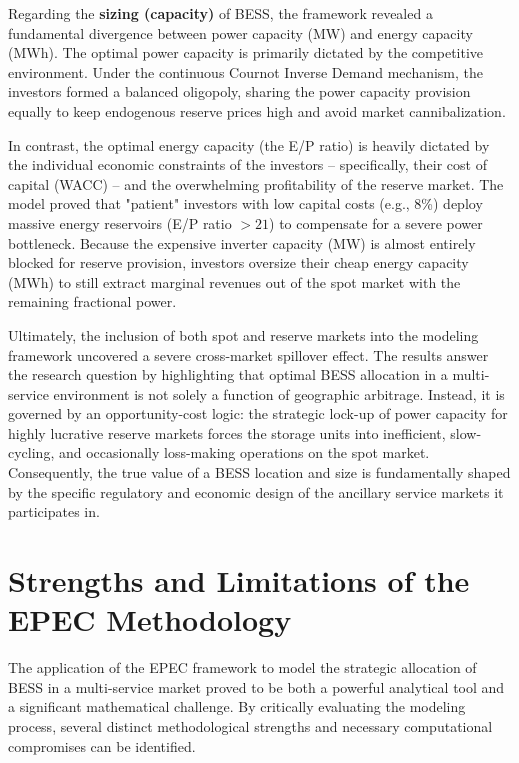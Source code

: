 Regarding the \textbf{sizing (capacity)} of BESS, the framework revealed a fundamental divergence between power capacity (MW) and energy capacity (MWh). The optimal power capacity is primarily dictated by the competitive environment. Under the continuous Cournot Inverse Demand mechanism, the investors formed a balanced oligopoly, sharing the power capacity provision equally to keep endogenous reserve prices high and avoid market cannibalization.

In contrast, the optimal energy capacity (the E/P ratio) is heavily dictated by the individual economic constraints of the investors -- specifically, their cost of capital (WACC) -- and the overwhelming profitability of the reserve market. The model proved that "patient" investors with low capital costs (e.g., 8\%) deploy massive energy reservoirs (E/P ratio $> 21$) to compensate for a severe power bottleneck. Because the expensive inverter capacity (MW) is almost entirely blocked for reserve provision, investors oversize their cheap energy capacity (MWh) to still extract marginal revenues out of the spot market with the remaining fractional power.

Ultimately, the inclusion of both spot and reserve markets into the modeling framework uncovered a severe cross-market spillover effect. The results answer the research question by highlighting that optimal BESS allocation in a multi-service environment is not solely a function of geographic arbitrage. Instead, it is governed by an opportunity-cost logic: the strategic lock-up of power capacity for highly lucrative reserve markets forces the storage units into inefficient, slow-cycling, and occasionally loss-making operations on the spot market. Consequently, the true value of a BESS location and size is fundamentally shaped by the specific regulatory and economic design of the ancillary service markets it participates in.

\section{Strengths and Limitations of the EPEC Methodology} \label{sec:strengths_limitations}

The application of the EPEC framework to model the strategic allocation of BESS in a multi-service market proved to be both a powerful analytical tool and a significant mathematical challenge. By critically evaluating the modeling process, several distinct methodological strengths and necessary computational compromises can be identified.


